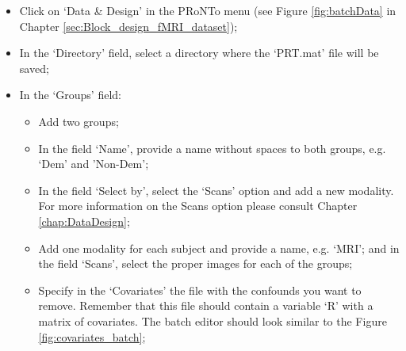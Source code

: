 \begin{itemize}

 	\item Click on `Data \& Design' in the PRoNTo menu (see Figure \ref{fig:batchData} in Chapter \ref{sec:Block_design_fMRI_dataset});	
	\item In the `Directory' field, select a directory where the `PRT.mat' file will be saved;
	
	\item In the `Groups' field:
 	
		\begin{itemize}
		
		\item Add two groups;
		
		\item In the field `Name', provide a name without spaces to both groups, e.g. `Dem' and 'Non-Dem'; 
		
		\item In the field `Select by', select the `Scans' option and add a new modality. For more information on the Scans option please consult Chapter \ref{chap:DataDesign};
		
		\item Add one modality for each subject and provide a name, e.g. `MRI'; and in the field `Scans', select the proper images for each of the groups;	
		
		\item Specify in the `Covariates' the file with the confounds you want to remove. Remember that this file should contain a variable `R' with a matrix of covariates. The batch editor should look similar to the Figure \ref{fig:covariates_batch};
		

\end{itemize}
\end{itemize}
